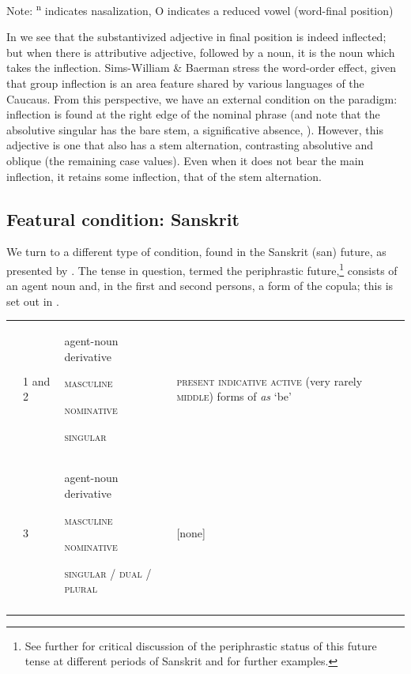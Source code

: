 \documentclass[output=paper]{langscibook}
\begin{document}
Note: \textsuperscript{n} indicates nasalization, O indicates a reduced vowel (word-final position)

In  we see that the substantivized adjective in final position is indeed inflected; but when there is attributive adjective, followed by a noun, it is the noun which takes the inflection. Sims-William \& Baerman stress the word-order effect, given that group inflection is an area feature shared by various languages of the Caucaus. From this perspective, we have an external condition on the paradigm: inflection is found at the right edge of the nominal phrase (and note that the absolutive singular has the bare stem, a significative absence, ). However, this adjective is one that also has a stem alternation, contrasting absolutive and oblique (the remaining case values). Even when it does not bear the main inflection, it retains some inflection, that of the stem alternation.

\subsection{\textbf{Featural} \textbf{condition:} \textbf{Sanskrit}}

We turn to a different type of condition, found in the Sanskrit (san) future, as presented by \citet{Stump2013}. The tense in question, termed the periphrastic future,\footnote{See further \citet{Lowe2017} for critical discussion of the periphrastic status of this future tense at different periods of Sanskrit and for further examples.}  consists of an agent noun and, in the first and second persons, a form of the copula; this is set out in .


\begin{tabularx}{\textwidth}{XXXX}

\lsptoprule
\multicolumn{1}{c}{ \textsc{person}} & 1 and \textsc{2}  & agent-noun derivative

\textsc{masculine}

\textsc{nominative}

\textsc{singular} & \textsc{present} \textsc{indicative} \textsc{active} (very rarely \textsc{middle}) forms of \textit{as} ‘be’\\
& 3 & agent-noun derivative 

\textsc{masculine}

\textsc{nominative}

\textsc{singular} \textsc{/} \textsc{dual} \textsc{/} \textsc{plural} & [none]\\
\lspbottomrule
\end{tabularx}
\begin{table}
\caption{Periphrastic future-tense formation in Sanskrit \citep[111]{Stump2013}}
\label{tab:key:11}
\end{table}
\end{document}

